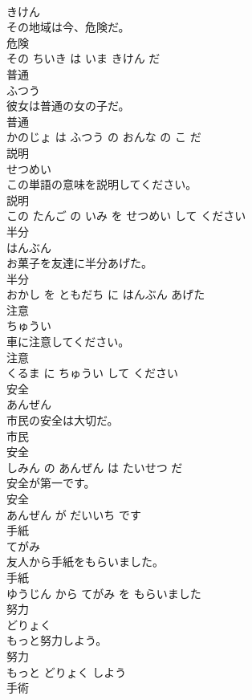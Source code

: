 \documentclass[8pt]{extreport}
\begin{document}
\begin{CJK}{UTF8}{min}
\\	きけん			
\\	その地域は今、危険だ。	
\\	危険 
\\	その ちいき は いま きけん だ			
\\	普通	
\\	ふつう			
\\	彼女は普通の女の子だ。	
\\	普通 
\\	かのじょ は ふつう の おんな の こ だ			
\\	説明	
\\	せつめい			
\\	この単語の意味を説明してください。	
\\	説明 
\\	この たんご の いみ を せつめい して ください			
\\	半分	
\\	はんぶん			
\\	お菓子を友達に半分あげた。	
\\	半分 
\\	おかし を ともだち に はんぶん あげた			
\\	注意	
\\	ちゅうい			
\\	車に注意してください。	
\\	注意 
\\	くるま に ちゅうい して ください			
\\	安全	
\\	あんぜん			
\\	市民の安全は大切だ。	
\\	市民 
\\	安全 
\\	しみん の あんぜん は たいせつ だ			
\\	安全が第一です。	
\\	安全 
\\	あんぜん が だいいち です			
\\	手紙	
\\	てがみ			
\\	友人から手紙をもらいました。	
\\	手紙 
\\	ゆうじん から てがみ を もらいました			
\\	努力	
\\	どりょく			
\\	もっと努力しよう。	
\\	努力 
\\	もっと どりょく しよう			
\\	手術	

\end{CJK}
\end{document}
